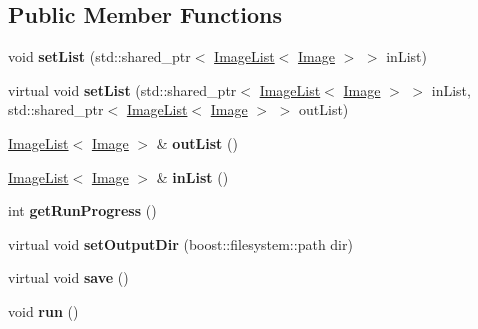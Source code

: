 \subsection*{Public Member Functions}
\begin{DoxyCompactItemize}
\item 
void {\bfseries set\+List} (std\+::shared\+\_\+ptr$<$ \hyperlink{classImageList}{Image\+List}$<$ \hyperlink{classImage}{Image} $>$ $>$ in\+List)\hypertarget{classImageProcessor_a1942aba3eae508a9c7301e592274514c}{}\label{classImageProcessor_a1942aba3eae508a9c7301e592274514c}

\item 
virtual void {\bfseries set\+List} (std\+::shared\+\_\+ptr$<$ \hyperlink{classImageList}{Image\+List}$<$ \hyperlink{classImage}{Image} $>$ $>$ in\+List, std\+::shared\+\_\+ptr$<$ \hyperlink{classImageList}{Image\+List}$<$ \hyperlink{classImage}{Image} $>$ $>$ out\+List)\hypertarget{classImageProcessor_a5feb19d8e2f9a7fa2abb4c822e996b24}{}\label{classImageProcessor_a5feb19d8e2f9a7fa2abb4c822e996b24}

\item 
\hyperlink{classImageList}{Image\+List}$<$ \hyperlink{classImage}{Image} $>$ \& {\bfseries out\+List} ()\hypertarget{classImageProcessor_a4a14ddc4205547c86b8dead7b5f59a73}{}\label{classImageProcessor_a4a14ddc4205547c86b8dead7b5f59a73}

\item 
\hyperlink{classImageList}{Image\+List}$<$ \hyperlink{classImage}{Image} $>$ \& {\bfseries in\+List} ()\hypertarget{classImageProcessor_ac69924b36456820bc0c1ab396ded7c4e}{}\label{classImageProcessor_ac69924b36456820bc0c1ab396ded7c4e}

\item 
int {\bfseries get\+Run\+Progress} ()\hypertarget{classImageProcessor_a72fe69335c081b23b5d2f81df9275f5a}{}\label{classImageProcessor_a72fe69335c081b23b5d2f81df9275f5a}

\item 
virtual void {\bfseries set\+Output\+Dir} (boost\+::filesystem\+::path dir)\hypertarget{classImageProcessor_a1113f7c6ce91bef9611128b86449eaed}{}\label{classImageProcessor_a1113f7c6ce91bef9611128b86449eaed}

\item 
virtual void {\bfseries save} ()\hypertarget{classImageProcessor_a3bc034cb23d44256d020a189b55a5f9f}{}\label{classImageProcessor_a3bc034cb23d44256d020a189b55a5f9f}

\item 
void {\bfseries run} ()\hypertarget{classImageProcessor_a2f7b0040d90bda19ae2f0393fbe59abd}{}\label{classImageProcessor_a2f7b0040d90bda19ae2f0393fbe59abd}

\end{DoxyCompactItemize}
